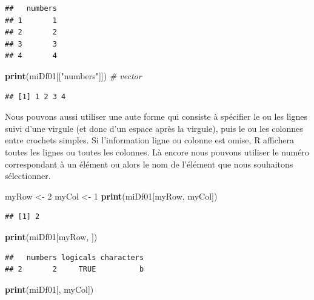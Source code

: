 \documentclass[]{book}
\newenvironment{Shaded}{\begin{snugshade}}{\end{snugshade}}
\newcommand{\CommentTok}[1]{\textcolor[rgb]{0.56,0.35,0.01}{\textit{#1}}}
\newcommand{\DecValTok}[1]{\textcolor[rgb]{0.00,0.00,0.81}{#1}}
\newcommand{\KeywordTok}[1]{\textcolor[rgb]{0.13,0.29,0.53}{\textbf{#1}}}
\newcommand{\NormalTok}[1]{#1}
\newcommand{\StringTok}[1]{\textcolor[rgb]{0.31,0.60,0.02}{#1}}
\begin{document}
\begin{verbatim}
##   numbers
## 1       1
## 2       2
## 3       3
## 4       4
\end{verbatim}

\begin{Shaded}
\begin{Highlighting}[]
\KeywordTok{print}\NormalTok{(miDf01[[}\StringTok{"numbers"}\NormalTok{]]) }\CommentTok{# vector}
\end{Highlighting}
\end{Shaded}

\begin{verbatim}
## [1] 1 2 3 4
\end{verbatim}

Nous pouvons aussi utiliser une aute forme qui consiste à spécifier le ou les lignes suivi d'une virgule (et donc d'un espace après la virgule), puis le ou les colonnes entre crochets simples. Si l'information ligne ou colonne est omise, R affichera toutes les lignes ou toutes les colonnes. Là encore nous pouvons utiliser le numéro correspondant à un élément ou alors le nom de l'élément que nous souhaitons sélectionner.

\begin{Shaded}
\begin{Highlighting}[]
\NormalTok{myRow <-}\StringTok{ }\DecValTok{2}
\NormalTok{myCol <-}\StringTok{ }\DecValTok{1}
\KeywordTok{print}\NormalTok{(miDf01[myRow, myCol])}
\end{Highlighting}
\end{Shaded}

\begin{verbatim}
## [1] 2
\end{verbatim}

\begin{Shaded}
\begin{Highlighting}[]
\KeywordTok{print}\NormalTok{(miDf01[myRow, ])}
\end{Highlighting}
\end{Shaded}

\begin{verbatim}
##   numbers logicals characters
## 2       2     TRUE          b
\end{verbatim}

\begin{Shaded}
\begin{Highlighting}[]
\KeywordTok{print}\NormalTok{(miDf01[, myCol])}
\end{Highlighting}
\end{Shaded}
\end{document}
